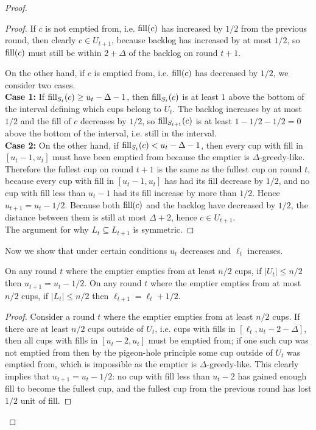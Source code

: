 \begin{proof}
\begin{proof}
    If $c$ is not emptied from, i.e. $\operatorname{\textnormal{fill}}(c)$ has increased by
    $1/2$ from the previous round, then
    clearly $c \in U_{t+1}$, because backlog has increased by at most $1/2$, so
    $\operatorname{\textnormal{fill}}(c)$ must still be within $2+\Delta$ of the backlog on round $t+1$. 

    On the other hand, if $c$ is emptied from, i.e. $\operatorname{\textnormal{fill}}(c)$ has decreased by
    $1/2$, we consider two cases.\\
    \textbf{Case 1:} If $\operatorname{\textnormal{fill}}_{S_t}(c) \ge u_t-\Delta -1$, then
    $\operatorname{\textnormal{fill}}_{S_t}(c)$ is at least $1$ above the bottom of the
    interval defining which cups belong to $U_t$. The backlog
    increases by at most $1/2$ and the fill of $c$ decreases by $1/2$, so
    $\operatorname{\textnormal{fill}}_{S_{t+1}}(c)$ is at least $1-1/2-1/2 = 0$ above the bottom of the
    interval, i.e. still in the interval. \\
    \textbf{Case 2:} On the other hand, if $\operatorname{\textnormal{fill}}_{S_t}(c) <
    u_t-\Delta-1$, then every cup with fill in $[u_t-1, u_t]$
    must have been emptied from because the emptier is
    $\Delta$-greedy-like. Therefore the fullest cup
    on round $t+1$ is the same as the fullest cup on round $t$,
    because every cup with fill in $[u_t-1, u_t]$
    has had its fill decrease by $1/2$, and no cup with fill less than
    $u_t-1$ had its fill increase by more than $1/2$. Hence $u_{t+1}
    = u_t -1/2$. Because both $\operatorname{\textnormal{fill}}(c)$ and the backlog
    have decreased by $1/2$, the distance between them is
    still at most $\Delta+2$, hence $c\in U_{t+1}$.\\
    The argument for why $L_t \subseteq L_{t+1}$ is symmetric.
  \end{proof}

  Now we show that under certain conditions $u_t$ decreases and
  $\ell_t$ increases.
  \begin{clm}
    \label{clm:howDoLandUchange}
    On any round $t$ where the emptier empties from at least
    $n/2$ cups, if $|U_t| \le n/2$ then $u_{t+1} = u_t - 1/2$.
    On any round $t$ where the emptier empties from at most $n/2$
    cups, if $|L_t| \le n/2$ then $\ell_{t+1} = \ell_t + 1/2$.
  \end{clm}
  \begin{proof}
    Consider a round $t$ where the emptier empties from at least
    $n/2$ cups. If there are at least $n/2$ cups outside of
    $U_t$, i.e. cups with fills in $[\ell_t, u_t-2-\Delta]$, then
    all cups with fills in $[u_t - 2, u_t]$ must be emptied from;
    if one such cup was not emptied from then by the pigeon-hole
    principle some cup outside of $U_t$ was emptied from, which
    is impossible as the emptier is $\Delta$-greedy-like. This
    clearly implies that $u_{t+1} = u_t - 1/2$: no cup with fill
    less than $u_t-2$ has gained enough fill to become the
    fullest cup, and the fullest cup from the previous round has
    lost $1/2$ unit of fill.


\end{proof}
\end{proof}
